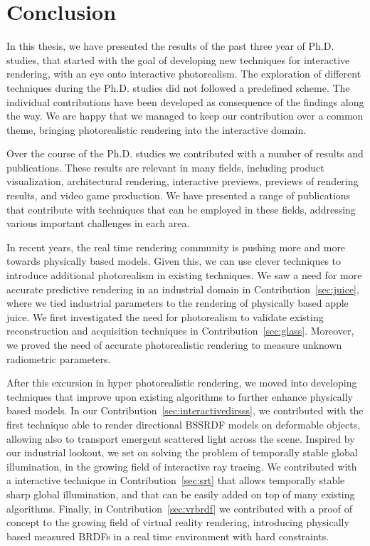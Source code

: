 \chapter{Conclusion}
In this thesis, we have presented the results of the past three year of Ph.D. studies, that started with the goal of developing new techniques for interactive rendering, with an eye onto interactive photorealism. The exploration of different techniques during the Ph.D. studies did not followed a predefined scheme. The individual contributions have been developed as consequence of the findings along the way. We are happy that we managed to keep our contribution over a common theme, bringing photorealistic rendering into the interactive domain.

Over the course of the Ph.D. studies we contributed with a number of results and publications. These results are relevant in many fields, including product visualization, architectural rendering, interactive previews, previews of rendering results, and video game production. We have presented a range of publications that contribute with techniques that can be employed in these fields, addressing various important challenges in each area. 

In recent years, the real time rendering community is pushing more and more towards physically based models. Given this, we can use clever techniques to introduce additional photorealism in existing techniques. We saw a need for more accurate predictive rendering in an industrial domain in Contribution~\ref{sec:juice}, where we tied industrial parameters to the rendering of physically based apple juice. We first investigated the need for photorealism to validate existing reconstruction and acquisition techniques in Contribution~\ref{sec:glass}. Moreover, we proved the need of accurate photorealistic rendering to measure unknown radiometric parameters. 

After this excursion in hyper photorealistic rendering, we moved into developing techniques that improve upon existing algorithms to further enhance physically based models. In our Contribution~\ref{sec:interactivedirsss}, we contributed with the first technique able to render directional BSSRDF models on deformable objects, allowing also to transport emergent scattered light across the scene. Inspired by our industrial lookout, we set on solving the problem of temporally stable global illumination, in the growing field of interactive ray tracing. We contributed with a interactive technique in Contribution~\ref{sec:srt} that allows temporally stable sharp global illumination, and that can be easily added on top of many existing algorithms. Finally, in Contribution~\ref{sec:vrbrdf} we contributed with a proof of concept to the growing field of virtual reality rendering, introducing physically based measured BRDFs in a real time environment with hard constraints.   

